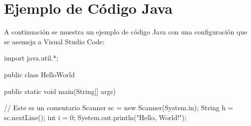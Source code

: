 \documentclass{article}
\begin{document}
\section{Ejemplo de Código Java}

A continuación se muestra un ejemplo de código Java con una configuración que se asemeja a Visual Studio Code:

\begin{javacode}
import java.util.*;

public class HelloWorld {
    public static void main(String[] args) {
        // Este es un comentario
        Scanner sc = new Scanner(System.in);
        String h = sc.nextLine();
        int i = 0;
        System.out.println("Hello, World!");
        
    }
}
\end{javacode}
\end{document}

